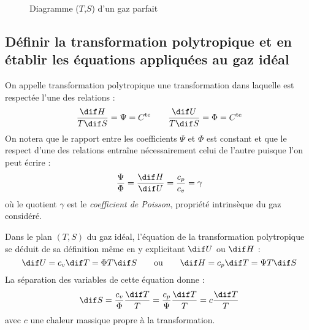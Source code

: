 	\begin{figure}[p]\centering
		\caption{Diagramme ($T$,$S$) d'un gaz parfait}
		\label{fig:TS_gaz_parfait}
	\end{figure}
\fi

\subsection{Définir la transformation polytropique et
en établir les équations appliquées au gaz idéal}
On appelle transformation polytropique une transformation
dans laquelle est respectée l'une des relations :
\[ \frac{\dif H}{T \dif S} = \Psi = C^\text{te}
\qquad \frac{\dif U}{T \dif S} = \Phi = C^\text{te} \]
On notera que le rapport entre les coefficients $\Psi$ et $\Phi$ est constant
et que le respect d'une des relations entraîne nécessairement celui de l'autre
puisque l'on peut écrire :
\[ \frac{\Psi}{\Phi} = \frac{\dif H}{\dif U} = \frac{c_p}{c_v} = \gamma \]
où le quotient $\gamma$ est le \emph{coefficient de Poisson}, 
propriété intrinsèque du gaz considéré.

Dans le plan $(T,S)$ du gaz idéal, l'équation de la transformation polytropique
se déduit de sa définition même en y explicitant $\dif U$ ou $\dif H$ :
\[ \dif U = c_v \dif T = \Phi T \dif S
\qquad \text{ou} \qquad \dif H = c_p \dif T = \Psi T \dif S \]
La séparation des variables de cette équation donne :
\[ \dif S = \frac{c_v}{\Phi}\frac{\dif T}{T}
= \frac{c_p}{\Psi}\frac{\dif T}{T}
= c\frac{\dif T}{T} \]
avec $c$ une chaleur massique propre à la transformation.

